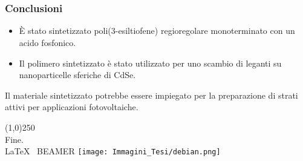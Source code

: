 \section{}
\begin{frame}
\frametitle{Conclusioni}
\begin{itemize}
 \item È stato sintetizzato poli(3-esiltiofene) regioregolare monoterminato con un acido fosfonico.
 \item Il polimero sintetizzato è stato utilizzato per uno scambio di leganti su nanoparticelle sferiche di CdSe.
\end{itemize}
Il materiale sintetizzato potrebbe essere impiegato per la preparazione di strati attivi per applicazioni fotovoltaiche.
\pause
\begin{center}\line(1,0){250}\\\vskip 20pt
{\LARGE Fine.}\\ \vskip 10pt
\LaTeX ~ {\rm BEAMER} \texttt{[image: Immagini\_Tesi/debian.png]}
\end{center}



\end{frame}
